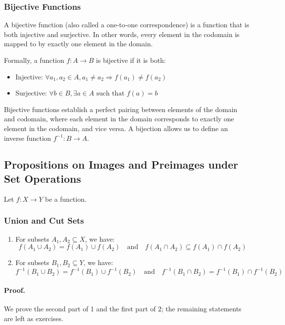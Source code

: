 \subsubsection{Bijective Functions}
A bijective function (also called a one-to-one correspondence) is a function that is both injective and surjective. In other words, every element in the codomain is mapped to by exactly one element in the domain.

Formally, a function $f: A \rightarrow B$ is bijective if it is both:
\begin{itemize}
    \item Injective: $\forall a_1, a_2 \in A, a_1 \neq a_2 \Rightarrow f(a_1) \neq f(a_2)$
    \item Surjective: $\forall b \in B, \exists a \in A \text{ such that } f(a) = b$
\end{itemize}
\noindent Bijective functions establish a perfect pairing between elements of the domain and codomain, where each element in the domain corresponds to exactly one element in the codomain, and vice versa. A bijection allows us to define an inverse function $f^{-1}: B \rightarrow A$.

\subsection{Propositions on Images and Preimages under Set Operations}

Let \( f : X \to Y \) be a function.

\subsubsection{Union and Cut Sets}
\begin{enumerate}[label=\roman*)]
    \item For subsets \( A_1, A_2 \subseteq X \), we have:
    \[
    f(A_1 \cup A_2) = f(A_1) \cup f(A_2)
    \quad \text{and} \quad
    f(A_1 \cap A_2) \subseteq f(A_1) \cap f(A_2)
    \]

    \item For subsets \( B_1, B_2 \subseteq Y \), we have:
    \[
    f^{-1}(B_1 \cup B_2) = f^{-1}(B_1) \cup f^{-1}(B_2)
    \quad \text{and} \quad
    f^{-1}(B_1 \cap B_2) = f^{-1}(B_1) \cap f^{-1}(B_2)
    \]
\end{enumerate}

\paragraph{Proof.}
We prove the second part of 1 and the first part of 2; the remaining statements are left as exercises.

